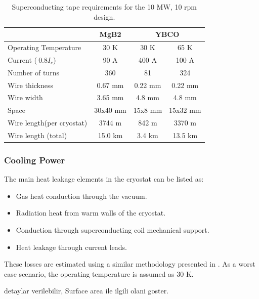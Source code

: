\documentclass[12pt]{iopart}
\begin{document}
\begin{table}[t]
  \centering
  \begin{tabular}{lccc}
& MgB2 & \multicolumn{2}{c}{YBCO} \\
\hline
Operating Temperature & 30 K & 30 K & 65 K \\
Current ($~0.8I_c$) & 90 A & 400 A & 100 A \\
Number of turns & 360 & 81 & 324 \\
Wire thickness & 0.67 mm & 0.22 mm & 0.22 mm \\
Wire width & 3.65 mm & 4.8 mm & 4.8 mm \\
Space & 30x40 mm & 15x8 mm & 15x32 mm \\
Wire length(per cryostat) & 3744 m & 842 m & 3370 m \\
Wire length (total) & 15.0 km & 3.4 km & 13.5 km \\
\hline
 \end{tabular}
  \caption{Superconducting tape requirements for the 10 MW, 10 rpm design.}
  \label{10MW_hts_wire_spec}
\end{table}


\subsubsection{Cooling Power}

The main heat leakage elements in the cryostat can be listed as:

\begin{itemize}
  \item Gas heat conduction through the vacuum.
  \item Radiation heat from  warm walls of the cryostat.  \item Conduction through superconducting coil mechanical support.
  \item Heat leakage through current leads.
\end{itemize}

These losses are estimated using a similar methodology presented in \cite{Abrahamsen2012, Simons2013}. As a worst case scenario, the operating temperature is assumed as 30 K.

detaylar verilebilir, Surface area ile ilgili olani goster.
\end{document}
